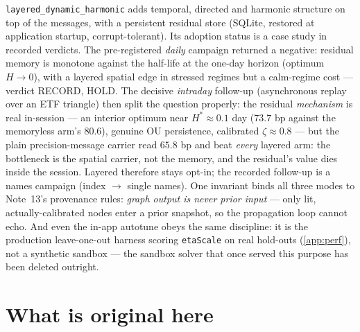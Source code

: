 \documentclass[11pt]{article}
\begin{document}
\texttt{layered\_dynamic\_harmonic} adds temporal, directed and harmonic
structure on top of the messages, with a persistent residual store (SQLite,
restored at application startup, corrupt-tolerant). Its adoption status is a
case study in recorded verdicts. The pre-registered \emph{daily} campaign
returned a negative: residual memory is monotone against the half-life at
the one-day horizon (optimum $H\to0$), with a layered spatial edge in
stressed regimes but a calm-regime cost --- verdict RECORD, HOLD. The
decisive \emph{intraday} follow-up (asynchronous replay over an ETF
triangle) then split the question properly: the residual \emph{mechanism} is
real in-session --- an interior optimum near $H^*\approx0.1$ day ($73.7$ bp
against the memoryless arm's $80.6$), genuine OU persistence, calibrated
$\zeta\approx0.8$ --- but the plain precision-message carrier read $65.8$
bp and beat \emph{every} layered arm: the bottleneck is the spatial
carrier, not the memory, and the residual's value dies inside the session.
Layered therefore stays opt-in; the recorded follow-up is a names campaign
(index $\to$ single names). One invariant binds all three modes to Note~13's
provenance rules: \emph{graph output is never prior input} --- only lit,
actually-calibrated nodes enter a prior snapshot, so the propagation loop
cannot echo. And even the in-app autotune obeys the same discipline: it is
the production leave-one-out harness scoring \texttt{etaScale} on real
hold-outs (\cref{app:perf}), not a synthetic sandbox --- the sandbox solver
that once served this purpose has been deleted outright.

\section{What is original here}
\label{sec:original}
\end{document}
